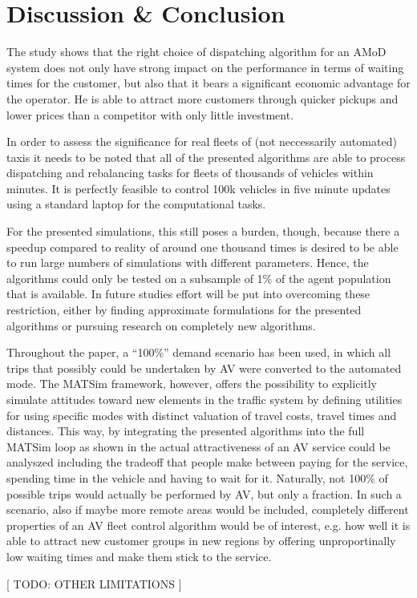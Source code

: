 \section{Discussion \& Conclusion}
\label{sec:Conclusion}

The study shows that the right choice of dispatching algorithm for an AMoD system
does not only have strong impact on the performance in terms of waiting times for
the customer, but also that it bears a significant economic advantage for the
operator. He is able to attract more customers through quicker pickups and
lower prices than a competitor with only little investment.

In order to assess the significance for real fleets of (not neccessarily
automated) taxis it needs to be noted that all of the presented algorithms are
able to process dispatching and rebalancing tasks for fleets of thousands of
vehicles within minutes. It is perfectly feasible to control 100k vehicles in
five minute updates using a standard laptop for the computational tasks.

For the presented simulations, this still poses a burden, though, because there
a speedup compared to reality of around one thousand times is desired to be able
to run large numbers of simulations with different parameters. Hence, the algorithms
could only be tested on a subsample of 1\% of the agent population that is available.
In future studies effort will be put into overcoming these restriction, either
by finding approximate formulations for the presented algorithms or pursuing research
on completely new algorithms.

Throughout the paper, a ``100\%'' demand scenario has been used, in which all
trips that possibly could be undertaken by AV were converted to the automated
mode. The MATSim framework, however, offers the possibility to explicitly
simulate attitudes toward new elements in the traffic system by defining utilities
for using specific modes with distinct valuation of travel costs, travel times and
distances. This way, by integrating the presented algorithms into the full
MATSim loop as shown in \cite{horl_abmtrans17} the actual attractiveness of an
AV service could be analyszed including the tradeoff that people make between
paying for the service, spending time in the vehicle and having to wait for it.
Naturally, not 100\% of possible trips would actually be performed by AV, but only
a fraction. In such a scenario, also if maybe more remote areas would be included,
completely different properties of an AV fleet control algorithm would be of
interest, e.g. how well it is able to attract new customer groups in new regions
by offering unproportinally low waiting times and make them stick to the service.



[ TODO: OTHER LIMITATIONS ]
